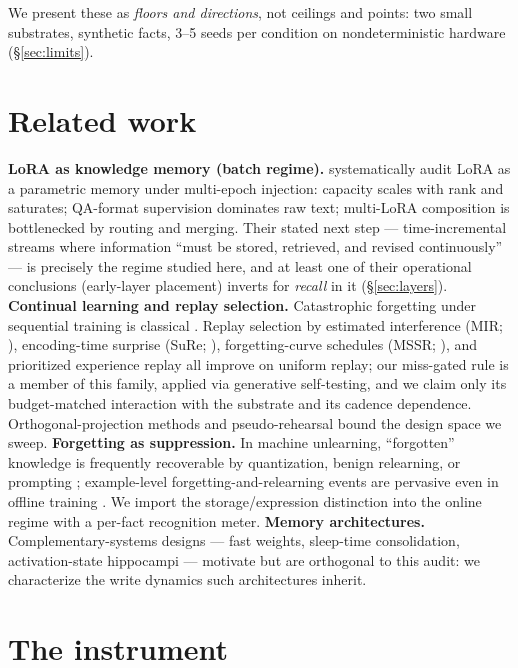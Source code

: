 \documentclass[11pt]{article}
\begin{document}
We present these as \emph{floors and directions}, not ceilings and points: two small substrates,
synthetic facts, 3--5 seeds per condition on nondeterministic hardware (\S\ref{sec:limits}).

\section{Related work}\label{sec:related}

\textbf{LoRA as knowledge memory (batch regime).} \citet{back2026lora} systematically audit LoRA as a
parametric memory under multi-epoch injection: capacity scales with rank and saturates; QA-format
supervision dominates raw text; multi-LoRA composition is bottlenecked by routing and merging. Their
stated next step --- time-incremental streams where information ``must be stored, retrieved, and revised
continuously'' --- is precisely the regime studied here, and at least one of their operational
conclusions (early-layer placement) inverts for \emph{recall} in it (\S\ref{sec:layers}).
\textbf{Continual learning and replay selection.} Catastrophic forgetting under sequential training is
classical \citep{mccloskey1989,kirkpatrick2017}. Replay selection by estimated interference (MIR;
\citealt{aljundi2019mir}), encoding-time surprise (SuRe; \citealt{sure2025}), forgetting-curve
schedules (MSSR; \citealt{mssr2026}), and prioritized experience replay \citep{schaul2015} all improve
on uniform replay; our miss-gated rule is a member of this family, applied via generative
self-testing, and we claim only its budget-matched interaction with the substrate and its cadence
dependence. Orthogonal-projection methods \citep{farajtabar2020ogd} and pseudo-rehearsal
\citep{robins1995} bound the design space we sweep. \textbf{Forgetting as suppression.} In machine
unlearning, ``forgotten'' knowledge is frequently recoverable by quantization, benign relearning, or
prompting \citep{quantization-unlearning,unlearning-deletion,kotha2023}; example-level
forgetting-and-relearning events are pervasive even in offline training \citep{toneva2019}. We import
the storage/expression distinction \citep{allenzhu2024} into the online regime with a per-fact
recognition meter. \textbf{Memory architectures.} Complementary-systems designs --- fast weights,
sleep-time consolidation, activation-state hippocampi \citep{behrouz2024titans,ahn2025} --- motivate
but are orthogonal to this audit: we characterize the write dynamics such architectures inherit.

\section{The instrument}\label{sec:instrument}
\end{document}

